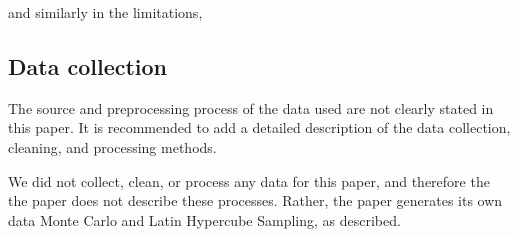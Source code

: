 \documentclass{ar2rc}
\begin{document}
\RC and similarly in the limitations,

\begin{quote}
    
    \DIFaddbegin {}\DIFaddend 
\end{quote}


\subsection{Data collection}
\RC The source and preprocessing process of the data used are not clearly stated
in this paper. It is recommended to add a detailed description of the data
collection, cleaning, and processing methods.

\AR We did not collect, clean, or process any data for this paper, and therefore the 
the paper does not describe these processes. Rather, the paper generates its own data 
Monte Carlo and Latin Hypercube Sampling, as described.
\end{document}

